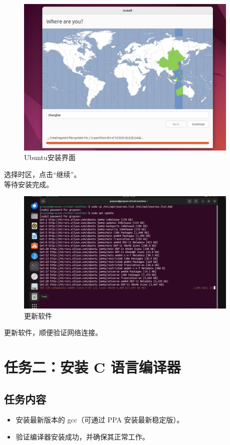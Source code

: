 \documentclass[UTF8]{ctexart}
\begin{document}
\begin{figure}[H]
    \centering
    \includegraphics[width=0.95\textwidth]{picture/Screenshot 2024-10-14 192408.png}
    \caption{Ubuntu安装界面}
\end{figure}
选择时区，点击“继续”。
\\等待安装完成。

\begin{figure}[H]
    \centering
    \includegraphics[width=0.95\textwidth]{picture/Screenshot 2024-10-14 193541.png}
    \caption{更新软件}
\end{figure}
更新软件，顺便验证网络连接。

\section{任务二：安装 C 语言编译器}
\subsection{任务内容}
\begin{itemize}
    \item 安装最新版本的 gcc（可通过 PPA 安装最新稳定版）。
    \item 验证编译器安装成功，并确保其正常工作。
\end{itemize}
\end{document}
